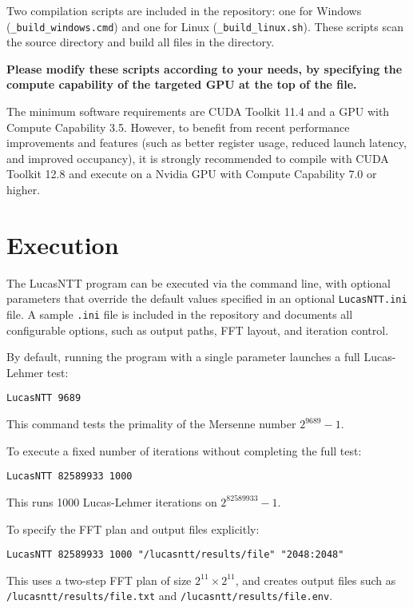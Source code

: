 \documentclass{article}
\begin{document}
Two compilation scripts are included in the repository: one for Windows (\texttt{\_build\_windows.cmd}) and one for Linux (\texttt{\_build\_linux.sh}). These scripts scan the source directory and build all files in the directory.

\textbf{Please modify these scripts according to your needs, by specifying the compute capability of the targeted GPU at the top of the file.}

The minimum software requirements are CUDA Toolkit 11.4 and a GPU with Compute Capability 3.5. 
However, to benefit from recent performance improvements and features (such as better register usage, reduced launch latency, and improved occupancy), it is strongly recommended to compile with CUDA Toolkit 12.8 and execute on a Nvidia GPU with Compute Capability 7.0 or higher.

\section{Execution}

The LucasNTT program can be executed via the command line, with optional parameters that override the default values specified in an optional \texttt{LucasNTT.ini} file. A sample \texttt{.ini} file is included in the repository and documents all configurable options, such as output paths, FFT layout, and iteration control.

\newpage
By default, running the program with a single parameter launches a full Lucas-Lehmer test:
\begin{verbatim}
LucasNTT 9689
\end{verbatim}
This command tests the primality of the Mersenne number $2^{9689} - 1$.

To execute a fixed number of iterations without completing the full test:
\begin{verbatim}
LucasNTT 82589933 1000
\end{verbatim}
This runs 1000 Lucas-Lehmer iterations on $2^{82589933} - 1$.

To specify the FFT plan and output files explicitly:
\begin{verbatim}
LucasNTT 82589933 1000 "/lucasntt/results/file" "2048:2048"
\end{verbatim}
This uses a two-step FFT plan of size $2^{11} \times 2^{11}$, and creates output files such as  \texttt{/lucasntt/results/file.txt} and \texttt{/lucasntt/results/file.env}.
\end{document}

